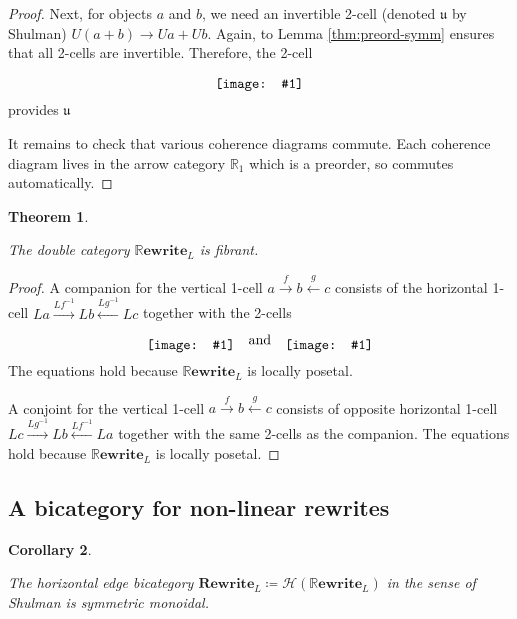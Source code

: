 \documentclass{amsart}
\newcommand{\RR}{\mathbb{R}}
\newcommand{\xto}[1]{\xrightarrow{#1}}
\newcommand{\xgets}[1]{\xleftarrow{#1}}
\newcommand{\diagram}[1]{\raisebox{-0.5\height}{\texttt{[image: \#1]}}}
\newcommand{\Rewrite}{\mathbf{Rewrite} }
\newcommand{\RRewrite}{ \mathbb{R}\mathbf{ewrite} }
\newtheorem{theorem}{Theorem}[section]
\newtheorem{corollary}[theorem]{Corollary}
\theoremstyle{remark}
\theoremstyle{definition}
\begin{document}
\begin{proof}
  Next, for objects $ a $ and $ b $, we need an invertible 2-cell
  (denoted $ \mathfrak{u} $ by Shulman) $ U(a + b) \to Ua + Ub
  $. Again, to Lemma \ref{thm:preord-symm} ensures that all 2-cells
  are invertible.  Therefore, the 2-cell
  \[
    \diagram{diag_nlr_dbl-rewrite-unit-functor-2cell}
  \]
  provides $ \mathfrak{u} $
	
  It remains to check that various coherence diagrams commute.  Each
  coherence diagram lives in the arrow category $ \RR_1 $ which is a
  preorder, so commutes automatically.
  
\end{proof}

\begin{theorem}
  \label{thm:dbl-rewr-fibrant}

  The double category $ \RRewrite_L $ is fibrant.

\end{theorem}

\begin{proof}

  A companion for the vertical 1-cell $ a \xto{f} b \xgets{g} c $
  consists of the horizontal 1-cell
  $ La \xto{Lf^{-1}} Lb \xgets{Lg^{-1}} Lc $ together with the 2-cells
  \[
    \diagram{diag_nlr_dbl-rewrite-companion1}
    \quad \text{and} \quad
    \diagram{diag_nlr_dbl-rewrite-companion2}
  \]
  The equations hold because $ \RRewrite_L $ is locally posetal.
	
  A conjoint for the vertical 1-cell $ a \xto{f} b \xgets{g} c $
  consists of opposite horizontal 1-cell
  $ Lc \xto{Lg^{-1}} Lb \xgets{Lf^{-1}} La $ together with the same
  2-cells as the companion.  The equations hold because
  $ \RRewrite_L $ is locally posetal.

\end{proof}	



\subsection{A bicategory for non-linear rewrites}
\label{sec:bicat-nonlinr-rewr}

\begin{corollary}
  \label{thm:bicat-rewr-smc}

  The horizontal edge bicategory
  $ \Rewrite_{L} \coloneqq \mathcal{H} \left( \RRewrite_{L} \right) $
  in the sense of Shulman is symmetric monoidal.

\end{corollary}
\end{document}
